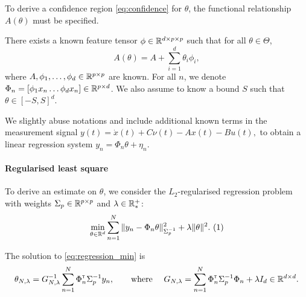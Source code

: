 \documentclass{article}
\begin{document}
To derive a confidence region \eqref{eq:confidence} for $\theta$, the functional relationship $A(\theta)$ must be specified.
\begin{assumption}[Structure]
\label{assumpt:structure}
There exists a known feature tensor $\phi\in \mathbb{R}^{d \times p \times p}$ such that for all $\theta\in\Theta$,
\begin{equation}
    A(\theta) = A + %
    \sum_{i=1}^d \theta_i\phi_i,
\end{equation}
where $A,\phi_1,\dots,\phi_d\in\mathbb{R}^{p\times p}$ are known. For all $n$, we denote $\Phi_n = [\phi_1 x_n \dots \phi_d x_n]\in\mathbb{R}^{p\times d}$.
We also assume to know a bound $S$ such that $\theta\in[-S,S]^d$.
\end{assumption}

We slightly abuse notations and include additional known terms in the measurement signal
$
    y(t) = \dot{x}(t) + C\nu(t) - A x(t) - Bu(t),
$ 
to obtain a linear regression system
$
y_n = \Phi_n\theta + \eta_n.
$

\paragraph{Regularised least square} To derive an estimate on $\theta$, we consider the $L_2$-regularised regression problem with weights $\Sigma_p\in\mathbb{R}^{p\times p}$ and $\lambda\in\mathbb{R}^+_*$:\hfill
$$
    \min_{\theta\in\Real^d} \sum_{n=1}^N \|y_n -\Phi_n\theta\|_{\Sigma_p^{-1}}^2 + \lambda\|\theta\|_{}^2.
    \refstepcounter{equation}~(\theequation)\label{eq:regression_min}
$$



\begin{proposition}
\label{prop:regularized_solution}
The solution to \eqref{eq:regression_min} is
\begin{align}
    \label{eq:vector_rls}
    \theta_{N,\lambda} = G_{N, \lambda}^{-1} \sum_{n=1}^N \Phi_n^{\mathsf{\scriptscriptstyle T}} \Sigma_p^{-1} y_n,\qquad
    \text{where }\quad G_{N, \lambda} = \sum_{n=1}^N \Phi_{n}^{\mathsf{\scriptscriptstyle T}}\Sigma_p^{-1}\Phi_{n}  + \lambda I_d \in \mathbb{R}^{d\times d}.
\end{align}
\end{proposition}
\end{document}
